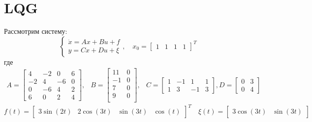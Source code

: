 \section{LQG}
Рассмотрим систему: 
\begin{equation}
    \begin{cases}
        \dot{x} = Ax + Bu + f\\
        y = Cx + Du + \xi
    \end{cases}, \quad x_0 = \begin{bmatrix}1 & 1 & 1 & 1\end{bmatrix}^T
\end{equation} 
где
\begin{equation}
    \begin{array}{cccc}
        A = \begin{bmatrix}
            4 & -2 & 0 & 6 \\ 
            -2 & 4 & -6 & 0 \\
            0 & -6 & 4 & 2 \\
            6 & 0 & 2 & 4
        \end{bmatrix}, & 
        B = \begin{bmatrix}
            11 & 0 \\
            -1 & 0 \\
            7 & 0 \\ 
            9 & 0 \\
        \end{bmatrix}, & 
        C = \begin{bmatrix}
            1 & -1 & 1 & 1 \\
            1 & 3 & -1 & 3
        \end{bmatrix}, 
        D = \begin{bmatrix} 
            0 & 3 \\ 
            0 & 4
        \end{bmatrix}
    \end{array}
\end{equation}
\begin{equation}
    f(t) = \begin{bmatrix}3\sin(2t) & 2\cos(3t) & \sin(3t) & \cos(t)\end{bmatrix}^T \quad \xi(t) = \begin{bmatrix}3\cos(3t) & \sin(3t)\end{bmatrix}
\end{equation}

